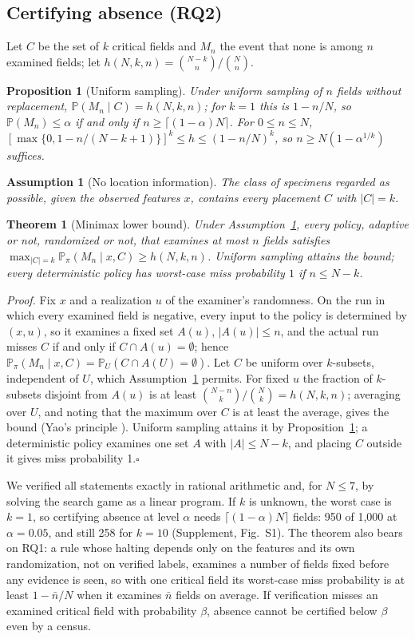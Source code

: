 \documentclass[journal]{IEEEtran}
\newtheorem{proposition}{Proposition}
\newtheorem{theorem}{Theorem}
\newtheorem{assumption}{Assumption}
\newcommand{\Prb}{\mathbb{P}}
\begin{document}
\subsection{Certifying absence (RQ2)}\label{sec:rq2}
Let $C$ be the set of $k$ critical fields and $M_n$ the event that none is among $n$ examined fields; let $h(N,k,n)=\binom{N-k}{n}/\binom{N}{n}$.
\begin{proposition}[Uniform sampling]\label{prop:uniform}
Under uniform sampling of $n$ fields without replacement, $\Prb(M_n\mid C)=h(N,k,n)$; for $k=1$ this is $1-n/N$, so $\Prb(M_n)\le\alpha$ if and only if $n\ge\lceil(1-\alpha)N\rceil$. For $0\le n\le N$, $[\max\{0,1-n/(N-k+1)\}]^k\le h\le(1-n/N)^k$, so $n\ge N(1-\alpha^{1/k})$ suffices.
\end{proposition}
\begin{assumption}[No location information]\label{ass:A}
The class of specimens regarded as possible, given the observed features $x$, contains every placement $C$ with $|C|=k$.
\end{assumption}
\begin{theorem}[Minimax lower bound]\label{thm:minimax}
Under Assumption~\ref{ass:A}, every policy, adaptive or not, randomized or not, that examines at most $n$ fields satisfies $\max_{|C|=k}\Prb_\pi(M_n\mid x,C)\ge h(N,k,n)$. Uniform sampling attains the bound; every deterministic policy has worst-case miss probability $1$ if $n\le N-k$.
\end{theorem}
\emph{Proof.} Fix $x$ and a realization $u$ of the examiner's randomness. On the run in which every examined field is negative, every input to the policy is determined by $(x,u)$, so it examines a fixed set $A(u)$, $|A(u)|\le n$, and the actual run misses $C$ if and only if $C\cap A(u)=\emptyset$; hence $\Prb_\pi(M_n\mid x,C)=\Prb_U(C\cap A(U)=\emptyset)$. Let $C$ be uniform over $k$-subsets, independent of $U$, which Assumption~\ref{ass:A} permits. For fixed $u$ the fraction of $k$-subsets disjoint from $A(u)$ is at least $\binom{N-n}{k}/\binom{N}{k}=h(N,k,n)$; averaging over $U$, and noting that the maximum over $C$ is at least the average, gives the bound (Yao's principle \cite{yao1977}). Uniform sampling attains it by Proposition~\ref{prop:uniform}; a deterministic policy examines one set $A$ with $|A|\le N-k$, and placing $C$ outside it gives miss probability 1.\hfill$\square$

We verified all statements exactly in rational arithmetic and, for $N\le7$, by solving the search game as a linear program. If $k$ is unknown, the worst case is $k=1$, so certifying absence at level $\alpha$ needs $\lceil(1-\alpha)N\rceil$ fields: 950 of 1,000 at $\alpha=0.05$, and still 258 for $k=10$ (Supplement, Fig.~S1). The theorem also bears on RQ1: a rule whose halting depends only on the features and its own randomization, not on verified labels, examines a number of fields fixed before any evidence is seen, so with one critical field its worst-case miss probability is at least $1-\bar n/N$ when it examines $\bar n$ fields on average. If verification misses an examined critical field with probability $\beta$, absence cannot be certified below $\beta$ even by a census.
\end{document}
